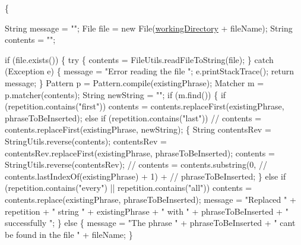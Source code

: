 \begin{DoxyCode}
                                                                       \{

        String message = \textcolor{stringliteral}{""};
        File file = \textcolor{keyword}{new} File(\hyperlink{classcom_1_1poly_1_1nlp_1_1filekommander_1_1file_1_1actions_1_1_file_action_utils_ad54a8fdc9145d2f423c54cb1597f874a}{workingDirectory} + fileName);
        String contents = \textcolor{stringliteral}{""};

        \textcolor{keywordflow}{if} (file.exists()) \{
            \textcolor{keywordflow}{try} \{
                contents = FileUtils.readFileToString(file);
            \} \textcolor{keywordflow}{catch} (Exception e) \{
                message = \textcolor{stringliteral}{"Error reading the file "};
                e.printStackTrace();
                \textcolor{keywordflow}{return} message;
            \}
            Pattern p = Pattern.compile(existingPhrase);
            Matcher m = p.matcher(contents);
            String newString = \textcolor{stringliteral}{""};
            \textcolor{keywordflow}{if} (m.find()) \{
                \textcolor{keywordflow}{if} (repetition.contains(\textcolor{stringliteral}{"first"}))
                    contents = contents.replaceFirst(existingPhrase,
                            phraseToBeInserted);
                \textcolor{keywordflow}{else} \textcolor{keywordflow}{if} (repetition.contains(\textcolor{stringliteral}{"last"}))
                \textcolor{comment}{// contents = contents.replaceFirst(existingPhrase, newString);}
                \{
                    String contentsRev = StringUtils.reverse(contents);
                    contentsRev = contentsRev.replaceFirst(existingPhrase,
                            phraseToBeInserted);
                    contents = StringUtils.reverse(contentsRev);
                    \textcolor{comment}{// contents = contents.substring(0,}
                    \textcolor{comment}{// contents.lastIndexOf(existingPhrase) + 1) +}
                    \textcolor{comment}{// phraseToBeInserted;}
                \} \textcolor{keywordflow}{else} \textcolor{keywordflow}{if} (repetition.contains(\textcolor{stringliteral}{"every"})
                        || repetition.contains(\textcolor{stringliteral}{"all"}))
                    contents = contents.replace(existingPhrase,
                            phraseToBeInserted);
                message = \textcolor{stringliteral}{"Replaced "} + repetition + \textcolor{stringliteral}{" string "}
                        + existingPhrase + \textcolor{stringliteral}{" with "} + phraseToBeInserted
                        + \textcolor{stringliteral}{" successfully "};
            \} \textcolor{keywordflow}{else} \{
                message = \textcolor{stringliteral}{"The phrase "} + phraseToBeInserted
                        + \textcolor{stringliteral}{" cant be found in the file "} + fileName;
            \}


\end{DoxyCode}
